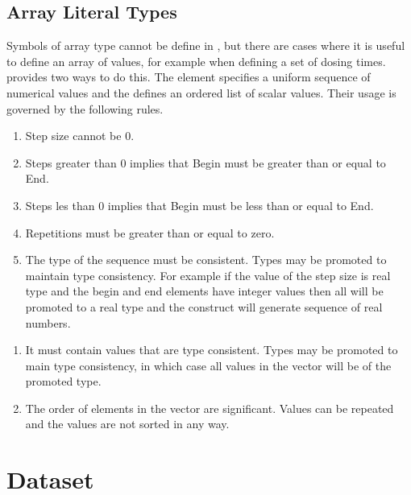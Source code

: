 \subsection{Array Literal Types}

Symbols of array type cannot be define in \pharmml, but there are
cases where it is useful to define an array of values, for example
when defining a set of dosing times. \pharmml provides two ways to do
this. The  element specifies a uniform sequence of
numerical values and the  defines an ordered
list of scalar values. Their usage is governed by the following rules.

\begin{valrules}

\begin{enumerate}
\item Step size cannot be 0.
\item Steps greater than 0 implies that Begin must be greater than or equal to End.
\item Steps les than 0 implies that Begin must be less than or equal
  to End.
\item Repetitions must be greater than or equal to zero.
\item The type of the sequence must be consistent. Types may be
  promoted to maintain type consistency. For example if the value of
  the step size is real type and the begin and end elements have
  integer values then all will be promoted to a real type and the
  construct will generate sequence of real numbers.
\end{enumerate}


\begin{enumerate}
\item It must contain values that are type
consistent. Types may be promoted to main type consistency, in which
case all values in the vector will be of the promoted type.
\item The order of elements in the vector are significant. Values can
  be repeated and the values are not sorted in any way.
\end{enumerate}
\end{valrules}

\section{Dataset}

